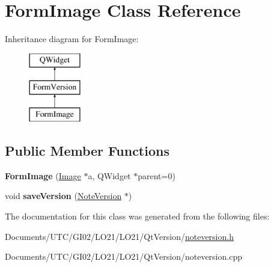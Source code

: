 \hypertarget{class_form_image}{}\section{Form\+Image Class Reference}
\label{class_form_image}
Inheritance diagram for Form\+Image\+:\begin{figure}[H]
\begin{center}
\leavevmode
\includegraphics[height=3.000000cm]{class_form_image}
\end{center}
\end{figure}
\subsection*{Public Member Functions}
\begin{DoxyCompactItemize}
\item 
\mbox{\label{class_form_image_aea7e0896a70f60a08fedc80a87cb6534}} 
{\bfseries Form\+Image} (\hyperlink{class_image}{Image} $\ast$a, Q\+Widget $\ast$parent=0)
\item 
\mbox{\label{class_form_image_a3fb6e3870e4c2217c9c7a58fe67072d3}} 
void {\bfseries save\+Version} (\hyperlink{class_note_version}{Note\+Version} $\ast$)
\end{DoxyCompactItemize}


The documentation for this class was generated from the following files\+:\begin{DoxyCompactItemize}
\item 
Documents/\+U\+T\+C/\+G\+I02/\+L\+O21/\+L\+O21/\+Qt\+Version/\hyperlink{noteversion_8h}{noteversion.\+h}\item 
Documents/\+U\+T\+C/\+G\+I02/\+L\+O21/\+L\+O21/\+Qt\+Version/noteversion.\+cpp\end{DoxyCompactItemize}
